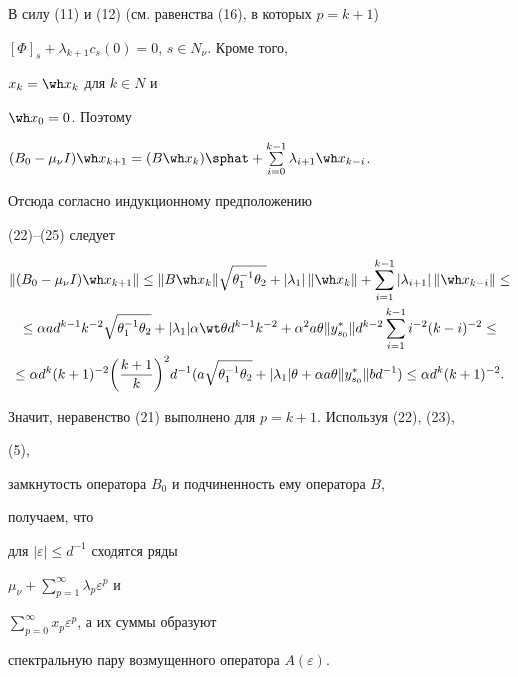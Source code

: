 \begin{pf}
В силу (11) и (12) (см. равенства (16), в которых $p=k+1$)\; 


$[\Phi]_s+\lambda_{k+1}c_s(0)=0$, $s\in N_\nu$. Кроме того, 


$x_k=\wh x_k$ для $k\in N$ и 


$\wh x_0=0$. Поэтому 


$(B_0-\mu_\nu I)\wh x_{k+1}=(B\wh x_k)\sphat+ 


\sum\limits^{k-1}_{i=0}\lambda_{i+1}\wh x_{k-i}$. 


Отсюда согласно индукционному предположению 


(22)--(25) следует


\begin{multline*} 


\|(B_0-\mu_\nu I)\wh x_{k+1}\|\le\|B\wh x_k\| 


\sqrt{\theta^{-1}_1\theta_2}+|\lambda_1|\,\|\wh x_k\|+ 


\sum^{k-1}_{i=1}|\lambda_{i+1}|\,\|\wh x_{k-i}\|\le \\ 


% 


\le \alpha a d^{k-1}k^{-2}\sqrt{\theta^{-1}_1\theta_2}+ 


|\lambda_1|\alpha\wt\theta d^{k-1}k^{-2}+ 


\alpha^2a\theta\|y^*_{s_0}\|d^{k-2}\sum^{k-1}_{i=1} 


i^{-2}(k-i)^{-2}\le \\ 


% 


\le \alpha d^k(k+1)^{-2}\bigg(\frac{k+1}{k}\bigg)^2 


d^{-1}(a\sqrt{\theta^{-1}_1\theta_2}+|\lambda_1|\theta+ 


\alpha a\theta\|y^*_{s_0}\|b d^{-1})\le 


\alpha d^k(k+1)^{-2}. 


\end{multline*} 


Значит, неравенство (21) выполнено для $p=k+1$. Используя (22), (23), 


(5), 


замкнутость оператора $B_0$ и подчиненность ему оператора $B$, 


получаем, что 


для $|\varepsilon|\le d^{-1}$ сходятся ряды 


$\mu_\nu+\sum\limits^\infty_{p=1}\lambda_p\varepsilon^p$ и 


$\sum\limits^\infty_{p=0}x_p\varepsilon^p$, а их суммы образуют 


спектральную пару возмущенного оператора $A(\varepsilon)$. 


\end{pf} 


